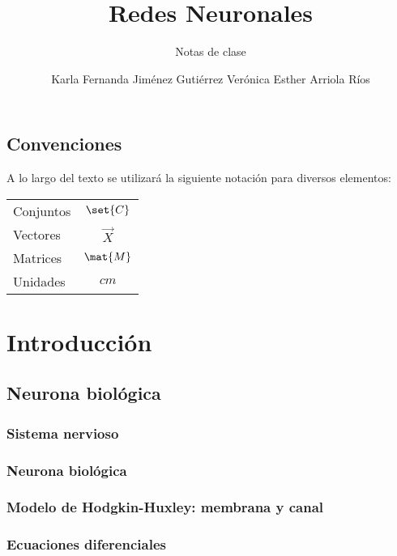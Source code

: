 \documentclass[12pt,openany]{book}
\title{Redes Neuronales}
\subtitle{Notas de clase}
\author{Karla Fernanda Jiménez Gutiérrez\newline
        Verónica Esther Arriola Ríos}
\begin{document}
\maketitle

\frontmatter %
\tableofcontents
\clearemptydoublepage %


\mainmatter  %


\chapter*{Convenciones}

A lo largo del texto se utilizará la siguiente notación para diversos elementos:
\begin{longtable}{lc}
 Conjuntos   &   $\set{C}$ \\
 Vectores    &   $\vec{X}$ \\
 Matrices    &   $\mat{M}$ \\
 Unidades    &   $\unit{cm}$
\end{longtable}



\part{Introducción}
\chapter{Neurona biológica}
\section{Sistema nervioso}
\section{Neurona biológica}
\section{Modelo de Hodgkin-Huxley: membrana y canal}
\section{Ecuaciones diferenciales}
\end{document}
